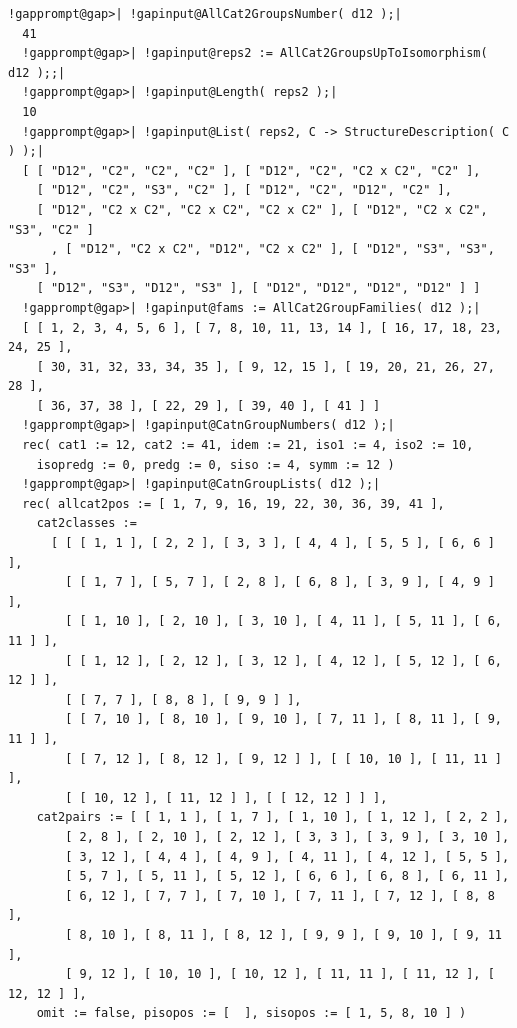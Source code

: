 \documentclass[a4paper,11pt]{report}
\begin{document}
{{\begin{Verbatim}[commandchars=!@|,fontsize=\small,frame=single,label=Example]
  !gapprompt@gap>| !gapinput@AllCat2GroupsNumber( d12 );|
  41
  !gapprompt@gap>| !gapinput@reps2 := AllCat2GroupsUpToIsomorphism( d12 );;|
  !gapprompt@gap>| !gapinput@Length( reps2 );|
  10
  !gapprompt@gap>| !gapinput@List( reps2, C -> StructureDescription( C ) );|
  [ [ "D12", "C2", "C2", "C2" ], [ "D12", "C2", "C2 x C2", "C2" ], 
    [ "D12", "C2", "S3", "C2" ], [ "D12", "C2", "D12", "C2" ], 
    [ "D12", "C2 x C2", "C2 x C2", "C2 x C2" ], [ "D12", "C2 x C2", "S3", "C2" ]
      , [ "D12", "C2 x C2", "D12", "C2 x C2" ], [ "D12", "S3", "S3", "S3" ], 
    [ "D12", "S3", "D12", "S3" ], [ "D12", "D12", "D12", "D12" ] ]
  !gapprompt@gap>| !gapinput@fams := AllCat2GroupFamilies( d12 );|
  [ [ 1, 2, 3, 4, 5, 6 ], [ 7, 8, 10, 11, 13, 14 ], [ 16, 17, 18, 23, 24, 25 ], 
    [ 30, 31, 32, 33, 34, 35 ], [ 9, 12, 15 ], [ 19, 20, 21, 26, 27, 28 ], 
    [ 36, 37, 38 ], [ 22, 29 ], [ 39, 40 ], [ 41 ] ]
  !gapprompt@gap>| !gapinput@CatnGroupNumbers( d12 );|
  rec( cat1 := 12, cat2 := 41, idem := 21, iso1 := 4, iso2 := 10, 
    isopredg := 0, predg := 0, siso := 4, symm := 12 )
  !gapprompt@gap>| !gapinput@CatnGroupLists( d12 );|
  rec( allcat2pos := [ 1, 7, 9, 16, 19, 22, 30, 36, 39, 41 ],
    cat2classes := 
      [ [ [ 1, 1 ], [ 2, 2 ], [ 3, 3 ], [ 4, 4 ], [ 5, 5 ], [ 6, 6 ] ], 
        [ [ 1, 7 ], [ 5, 7 ], [ 2, 8 ], [ 6, 8 ], [ 3, 9 ], [ 4, 9 ] ], 
        [ [ 1, 10 ], [ 2, 10 ], [ 3, 10 ], [ 4, 11 ], [ 5, 11 ], [ 6, 11 ] ], 
        [ [ 1, 12 ], [ 2, 12 ], [ 3, 12 ], [ 4, 12 ], [ 5, 12 ], [ 6, 12 ] ], 
        [ [ 7, 7 ], [ 8, 8 ], [ 9, 9 ] ], 
        [ [ 7, 10 ], [ 8, 10 ], [ 9, 10 ], [ 7, 11 ], [ 8, 11 ], [ 9, 11 ] ], 
        [ [ 7, 12 ], [ 8, 12 ], [ 9, 12 ] ], [ [ 10, 10 ], [ 11, 11 ] ], 
        [ [ 10, 12 ], [ 11, 12 ] ], [ [ 12, 12 ] ] ], 
    cat2pairs := [ [ 1, 1 ], [ 1, 7 ], [ 1, 10 ], [ 1, 12 ], [ 2, 2 ], 
        [ 2, 8 ], [ 2, 10 ], [ 2, 12 ], [ 3, 3 ], [ 3, 9 ], [ 3, 10 ], 
        [ 3, 12 ], [ 4, 4 ], [ 4, 9 ], [ 4, 11 ], [ 4, 12 ], [ 5, 5 ], 
        [ 5, 7 ], [ 5, 11 ], [ 5, 12 ], [ 6, 6 ], [ 6, 8 ], [ 6, 11 ], 
        [ 6, 12 ], [ 7, 7 ], [ 7, 10 ], [ 7, 11 ], [ 7, 12 ], [ 8, 8 ], 
        [ 8, 10 ], [ 8, 11 ], [ 8, 12 ], [ 9, 9 ], [ 9, 10 ], [ 9, 11 ], 
        [ 9, 12 ], [ 10, 10 ], [ 10, 12 ], [ 11, 11 ], [ 11, 12 ], [ 12, 12 ] ],
    omit := false, pisopos := [  ], sisopos := [ 1, 5, 8, 10 ] )
  
\end{Verbatim}
 }

 }

         
\end{document}
